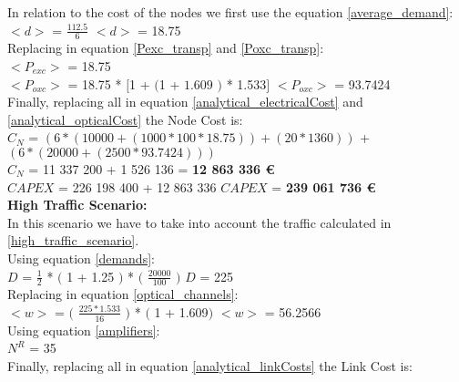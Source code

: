 In relation to the cost of the nodes we first use the equation \ref{average_demand}:\\

$<d>$ = $\frac{112.5}{6}$ \qquad \qquad $<d>$ = 18.75\\

Replacing in equation \ref{Pexc_transp} and \ref{Poxc_transp}:\\

$<P_{exc}>$ = 18.75\\

$<P_{oxc}>$ = 18.75 * $[$1 + $($1 + $1.609$ $)$ * 1.533$]$ \qquad \quad $<P_{oxc}>$ = 93.7424 \\

Finally, replacing all in equation \ref{analytical_electricalCost} and \ref{analytical_opticalCost} the Node Cost is:\\

$C_N$ = $\left(6 * (10 000 + (1 000 * 100 * 18.75)) + (20 * 1 360)\right)$ + $\left(6*(20 000 + (2 500 * 93.7424)) \right)$\\

$C_N$ = 11 337 200 + 1 526 136 = \textbf{12 863 336 \euro}\\

$CAPEX$ = 226 198 400 + 12 863 336 \qquad \qquad $CAPEX$ = \textbf{239 061 736 \euro}\\

\textbf{High Traffic Scenario:}\\

In this scenario we have to take into account the traffic calculated in \ref{high_traffic_scenario}.\\

Using equation \ref{demands}:\\

$D$ = $\frac{1}{2}$ * $($ 1 + 1.25 $)$ * $($ $\frac{20000}{100}$ $)$ \qquad \qquad $D$ = 225\\

Replacing in equation \ref{optical_channels}:\\

$<w>$ = $($ $\frac{225 * 1.533}{16}$ $)$ * $($ 1 + 1.609$)$ \qquad \qquad $<w>$ = 56.2566\\

Using equation \ref{amplifiers}:\\

$N^R$ = 35\\

Finally, replacing all in equation \ref{analytical_linkCosts} the Link Cost is:\\

